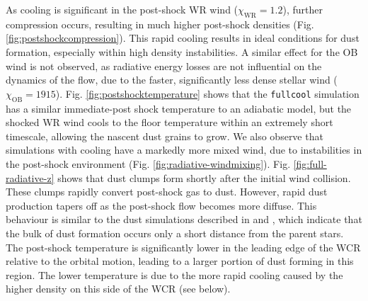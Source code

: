 \documentclass[fleqn,usenatbib]{mnras}
\begin{document}
As cooling is significant in the post-shock WR wind ($\chi_\text{WR} = 1.2$), further compression occurs, resulting in much higher post-shock densities (Fig. \ref{fig:postshockcompression}).
This rapid cooling results in ideal conditions for dust formation, especially within high density instabilities.
A similar effect for the OB wind is not observed, as radiative energy losses are not influential on the dynamics of the flow, due to the faster, significantly less dense stellar wind ($\chi_\text{OB} = 1915$).
Fig. \ref{fig:postshocktemperature} shows that the \texttt{fullcool} simulation has a similar immediate-post shock temperature to an adiabatic model, but the shocked WR wind cools to the floor temperature within an extremely short timescale, allowing the nascent dust grains to grow.
We also observe that simulations with cooling have a markedly more mixed wind, due to instabilities in the post-shock environment (Fig. \ref{fig:radiative-windmixing}).
Fig. \ref{fig:full-radiative-z} shows that dust clumps form shortly after the initial wind collision.
These clumps rapidly convert post-shock gas to dust.
However, rapid dust production tapers off as the post-shock flow becomes more diffuse.
This behaviour is similar to the dust simulations described in \cite{harriesThreedimensionalDustRadiativetransfer2004} and \cite{hendrix_pinwheels_2016}, which indicate that the bulk of dust formation occurs only a short distance from the parent stars.
The post-shock temperature is significantly lower in the leading edge of the WCR relative to the orbital motion, leading to a larger portion of dust forming in this region.
The lower temperature is due to the more rapid cooling caused by the higher density on this side of the WCR (see below).
\end{document}
